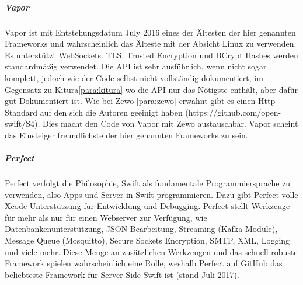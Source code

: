 \subparagraph{Vapor}
\label{para:vapor}
Vapor ist mit Entstehungsdatum July 2016 eines der Ältesten der hier genannten Frameworks und wahrscheinlich das Älteste mit der Absicht Linux zu verwenden. Es unterstützt WebSockets. TLS, Trusted Encryption und BCrypt Hashes werden standardmäßig verwendet. Die API ist sehr ausführlich, wenn nicht sogar komplett, jedoch wie der Code selbst nicht vollständig dokumentiert, im Gegensatz zu Kitura\ref{para:kitura} wo die API nur das Nötigste enthält, aber dafür gut Dokumentiert ist. Wie bei Zewo \ref{para:zewo} erwähnt gibt es einen Http-Standard auf den sich die Autoren geeinigt haben (https://github.com/open-swift/S4). Dies macht den Code von Vapor mit Zewo austauschbar. Vapor scheint das Einsteiger freundlichste der hier genannten Frameworks zu sein.
\subparagraph{Perfect}
\label{para:perfect}
Perfect verfolgt die Philosophie, Swift als fundamentale Programmiersprache zu verwenden, also Apps und Server in Swift programmieren. Dazu gibt Perfect volle Xcode Unterstützung für Entwicklung und Debugging. Perfect stellt Werkzeuge für mehr als nur für einen Webserver zur Verfügung, wie Datenbankenunterstützung, JSON-Bearbeitung, Streaming (Kafka Module), Message Queue (Mosquitto), Secure Sockets Encryption, SMTP, XML, Logging und viele mehr. Diese Menge an zusätzlichen Werkzeugen und das schnell robuste Framework spielen wahrscheinlich eine Rolle, weshalb Perfect auf GitHub das beliebteste Framework für Server-Side Swift ist (stand Juli 2017).
\chapterend
